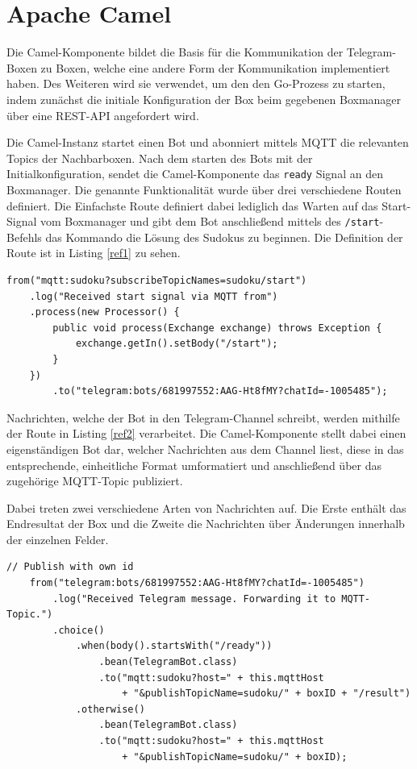 \documentclass[11pt,parskip=full]{scrartcl}
\begin{document}
\section{Apache Camel}

Die Camel-Komponente bildet die Basis für die Kommunikation der Telegram-Boxen zu Boxen, welche eine andere Form der Kommunikation implementiert haben. Des Weiteren wird sie verwendet, um den den Go-Prozess zu starten, indem zunächst die initiale Konfiguration der Box beim gegebenen Boxmanager über eine REST-API angefordert wird.

Die Camel-Instanz startet einen Bot und abonniert mittels MQTT die relevanten Topics der Nachbarboxen.
Nach dem starten des Bots mit der Initialkonfiguration, sendet die Camel-Komponente das \texttt{ready} Signal an den Boxmanager. Die genannte Funktionalität wurde über drei verschiedene Routen definiert. Die Einfachste Route definiert dabei lediglich das Warten auf das Start-Signal vom Boxmanager und gibt dem Bot anschließend mittels des \texttt{/start}-Befehls das Kommando die Lösung des Sudokus zu beginnen. Die Definition der Route ist in Listing \ref{ref1} zu sehen.

\begin{lstlisting}[caption = Route für Start Nachricht,label=ref1]
from("mqtt:sudoku?subscribeTopicNames=sudoku/start")
    .log("Received start signal via MQTT from")
    .process(new Processor() {
        public void process(Exchange exchange) throws Exception {
            exchange.getIn().setBody("/start");
        }
    })
        .to("telegram:bots/681997552:AAG-Ht8fMY?chatId=-1005485");
\end{lstlisting}

Nachrichten, welche der Bot in den Telegram-Channel schreibt, werden mithilfe der Route in Listing \ref{ref2} verarbeitet. Die Camel-Komponente stellt dabei einen eigenständigen Bot dar, welcher Nachrichten aus dem Channel liest, diese in das entsprechende, einheitliche Format umformatiert und anschließend über das zugehörige MQTT-Topic publiziert.

Dabei treten zwei verschiedene Arten von Nachrichten auf. Die Erste enthält das Endresultat der Box und die Zweite die Nachrichten über Änderungen innerhalb der einzelnen Felder.

\begin{lstlisting}[caption = Nachrichten von Telegram zu MQTT, label=ref2]
// Publish with own id
    from("telegram:bots/681997552:AAG-Ht8fMY?chatId=-1005485")
        .log("Received Telegram message. Forwarding it to MQTT-Topic.")
        .choice()
            .when(body().startsWith("/ready"))
                .bean(TelegramBot.class)
                .to("mqtt:sudoku?host=" + this.mqttHost
                    + "&publishTopicName=sudoku/" + boxID + "/result")
            .otherwise()
                .bean(TelegramBot.class)
                .to("mqtt:sudoku?host=" + this.mqttHost
                    + "&publishTopicName=sudoku/" + boxID);
\end{lstlisting}
\end{document}
